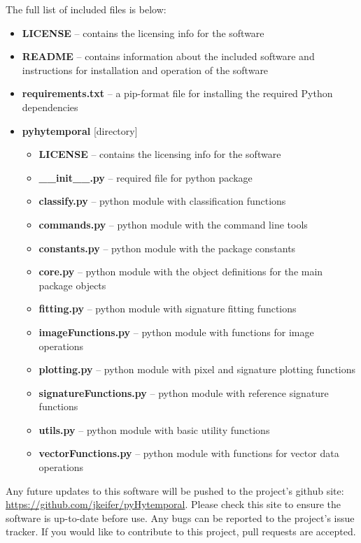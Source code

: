 The full list of included files is below:

\begin{Spacing}{1.2}
\begin{itemize}
  \item \textbf{LICENSE} -- contains the licensing info for the software
  \item \textbf{README} -- contains information about the included software and instructions for installation and operation of the software
  \item \textbf{requirements.txt} -- a pip-format file for installing the required Python dependencies
  \item \textbf{pyhytemporal} [directory]
  \begin{itemize}
    \item \textbf{LICENSE} -- contains the licensing info for the software
    \item \textbf{\_\_init\_\_.py} -- required file for python package
    \item \textbf{classify.py} -- python module with classification functions
    \item \textbf{commands.py} -- python module with the command line tools
    \item \textbf{constants.py} -- python module with the package constants
    \item \textbf{core.py} -- python module with the object definitions for the main package objects
    \item \textbf{fitting.py} -- python module with signature fitting functions
    \item \textbf{imageFunctions.py} -- python module with functions for image operations
    \item \textbf{plotting.py} -- python module with pixel and signature plotting functions
    \item \textbf{signatureFunctions.py} -- python module with reference signature functions
    \item \textbf{utils.py} -- python module with basic utility functions
    \item \textbf{vectorFunctions.py} -- python module with functions for vector data operations
  \end{itemize}
\end{itemize}
\end{Spacing}

Any future updates to this software will be pushed to the project's github site: \url{https://github.com/jkeifer/pyHytemporal}. Please check this site to ensure the software is up-to-date before use. Any bugs can be reported to the project's issue tracker. If you would like to contribute to this project, pull requests are accepted.